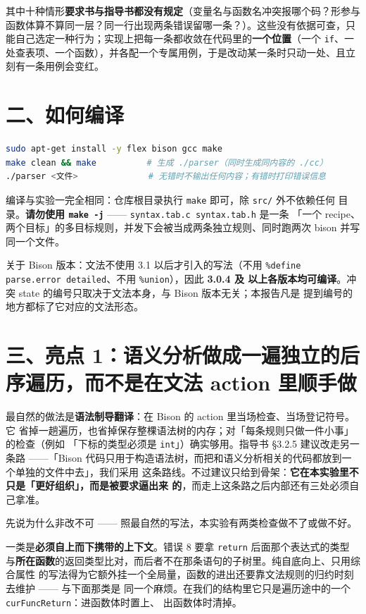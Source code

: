 \documentclass[11pt,a4paper]{ctexart}
\newcommand{\code}[1]{\texttt{#1}}
\begin{document}
其中十种情形\textbf{要求书与指导书都没有规定}（变量名与函数名冲突报哪个码？形参与函数体算不算同一层？同一行出现两条错误留哪一条？）。这些没有依据可查，只能自己选定一种行为；实现上把每一条都收敛在代码里的\textbf{一个位置}（一个 \code{if}、一处查表项、一个函数），并各配一个专属用例，于是改动某一条时只动一处、且立刻有一条用例会变红。

\section*{二、如何编译}

\begin{lstlisting}[language=bash]
sudo apt-get install -y flex bison gcc make
make clean && make          # 生成 ./parser（同时生成同内容的 ./cc）
./parser <文件>              # 无错时不输出任何内容；有错时打印错误信息
\end{lstlisting}

编译与实验一完全相同：仓库根目录执行 \code{make} 即可，除 \code{src/} 外不依赖任何
目录。\textbf{请勿使用 \code{make -j}} —— \code{syntax.tab.c syntax.tab.h} 是一条
「一个 recipe、两个目标」的多目标规则，并发下会被当成两条独立规则、同时跑两次 bison
并写同一个文件。

关于 Bison 版本：文法不使用 3.1 以后才引入的写法（不用
\code{\%define parse.error detailed}、不用 \code{\%union}），因此 \textbf{3.0.4 及
以上各版本均可编译}。冲突 state 的编号只取决于文法本身，与 Bison 版本无关；本报告凡是
提到编号的地方都标了它对应的文法形态。

\section*{三、亮点 1：语义分析做成一遍独立的后序遍历，而不是在文法 action 里顺手做}

最自然的做法是\textbf{语法制导翻译}：在 Bison 的 action 里当场检查、当场登记符号。它
省掉一趟遍历，也省掉保存整棵语法树的内存；对「每条规则只做一件小事」的检查（例如
「下标的类型必须是 \code{int}」）确实够用。指导书 §3.2.5 建议改走另一条路 ——「Bison
代码只用于构造语法树，而把和语义分析相关的代码都放到一个单独的文件中去」，我们采用
这条路线。不过建议只给到骨架：\textbf{它在本实验里不只是「更好组织」，而是被要求逼出来
的}，而走上这条路之后内部还有三处必须自己拿准。

先说为什么非改不可 —— 照最自然的写法，本实验有两类检查做不了或做不好。

一类是\textbf{必须自上而下携带的上下文}。错误 8 要拿 \code{return} 后面那个表达式的类型
与\textbf{所在函数}的返回类型比对，而后者不在那条语句的子树里。纯自底向上、只用综合属性
的写法得为它额外挂一个全局量，函数的进出还要靠文法规则的归约时刻去维护 —— 与下面那类是
同一个麻烦。在我们的结构里它只是遍历途中的一个 \code{curFuncReturn}：进函数体时置上、
出函数体时清掉。
\end{document}
